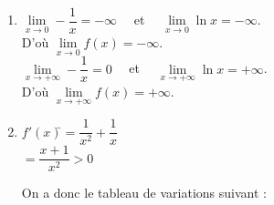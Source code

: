 \documentclass[a4paper,11pt,exos]{nsi} %
\begin{document}
\textcolor{UGLiBlue}{
    \begin{multicols}{2}
        \begin{enumerate}
            \item $\lim\limits_{x\to 0} -\dfrac{1}{x}=-\infty\quad$ et $\quad\lim\limits_{x\to 0} \ln x=-\infty$.\\[.5em]
            D'où $\lim\limits_{x\to 0} f(x)=-\infty$.\\[1em]
            $\lim\limits_{x\to +\infty} -\dfrac{1}{x}=0\quad$ et $\quad\lim\limits_{x\to +\infty} \ln x=+\infty$.\\[.5em]
            D'où $\lim\limits_{x\to +\infty} f(x)=+\infty$.
            \item \begin{tabbing}
                $f'(x)$\=$=\dfrac{1}{x^2}+\dfrac{1}{x}$\\[.5em]
                \>$=\dfrac{x+1}{x^2}>0$
            \end{tabbing}
            \vfill\null
            \columnbreak
            On a donc le tableau de variations suivant :
            \begin{center}
            \end{center}
        \end{enumerate}
    \end{multicols}
}

\end{document}
